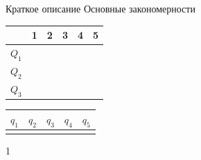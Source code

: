 \documentclass[a4paper, 14pt]{article}
\date{}
\begin{document}
 {
  Краткое описание
  \newpage
} {
  Основные закономерности
} {
  \begin{center}
    \begin{tabular}{|c|c|c|c|c|c|} \hline
       & 1 & 2 & 3 & 4 & 5 \\ \hline
      $Q_1$ &  &  &  &  &  \\ \hline
      $Q_2$ &  &  &  &  &  \\ \hline
      $Q_3$ &  &  &  &  &  \\ \hline
    \end{tabular}
  \end{center}
} {
  \begin{center}
    \setlength{\tabcolsep}{10pt}\large
    \begin{tabular}{|c|c|c|c|c|} \hline
      $q_1$ & $q_2$ & $q_3$ & $q_4$ & $q_5$ \\ \hline
      & & & & \\ \hline
    \end{tabular}
  \end{center}
} {1} %
\end{document}
